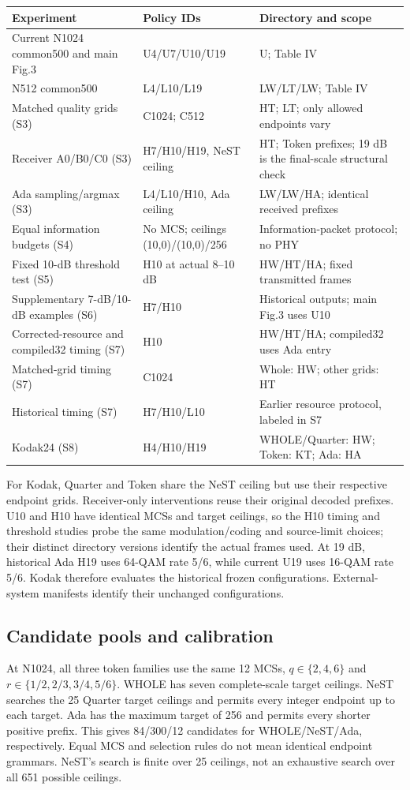 \documentclass[10pt,letterpaper]{article}
\begin{document}
\begin{longtable}{@{}p{6.2cm}p{3.1cm}p{6.0cm}@{}}\toprule
Experiment & Policy IDs & Directory and scope\\\midrule\endhead
Current N1024 common500 and main Fig.3 & U4/U7/U10/U19 & U; Table IV\\
N512 common500 & L4/L10/L19 & LW/LT/LW; Table IV\\
Matched quality grids (S3) & C1024; C512 & HT; LT; only allowed endpoints vary\\
Receiver A0/B0/C0 (S3) & H7/H10/H19, NeST ceiling & HT; Token prefixes; 19 dB is the final-scale structural check\\
Ada sampling/argmax (S3) & L4/L10/H10, Ada ceiling & LW/LW/HA; identical received prefixes\\
Equal information budgets (S4) & No MCS; ceilings (10,0)/(10,0)/256 & Information-packet protocol; no PHY\\
Fixed 10-dB threshold test (S5) & H10 at actual 8--10 dB & HW/HT/HA; fixed transmitted frames\\
Supplementary 7-dB/10-dB examples (S6) & H7/H10 & Historical outputs; main Fig.3 uses U10\\
Corrected-resource and compiled32 timing (S7) & H10 & HW/HT/HA; compiled32 uses Ada entry\\
Matched-grid timing (S7) & C1024 & Whole: HW; other grids: HT\\
Historical timing (S7) & H7/H10/L10 & Earlier resource protocol, labeled in S7\\
Kodak24 (S8) & H4/H10/H19 & WHOLE/Quarter: HW; Token: KT; Ada: HA\\
\bottomrule\end{longtable}
For Kodak, Quarter and Token share the NeST ceiling but use their respective endpoint grids. Receiver-only interventions reuse their original decoded prefixes. U10 and H10 have identical MCSs and target ceilings, so the H10 timing and threshold studies probe the same modulation/coding and source-limit choices; their distinct directory versions identify the actual frames used. At 19 dB, historical Ada H19 uses 64-QAM rate 5/6, while current U19 uses 16-QAM rate 5/6. Kodak therefore evaluates the historical frozen configurations. External-system manifests identify their unchanged configurations.

\subsection{Candidate pools and calibration}
At N1024, all three token families use the same 12 MCSs, $q\in\{2,4,6\}$ and $r\in\{1/2,2/3,3/4,5/6\}$. WHOLE has seven complete-scale target ceilings. NeST searches the 25 Quarter target ceilings and permits every integer endpoint up to each target. Ada has the maximum target of 256 and permits every shorter positive prefix. This gives 84/300/12 candidates for WHOLE/NeST/Ada, respectively. Equal MCS and selection rules do not mean identical endpoint grammars. NeST's search is finite over 25 ceilings, not an exhaustive search over all 651 possible ceilings.
\end{document}
